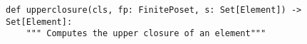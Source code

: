 \begin{verbatim}
def upperclosure(cls, fp: FinitePoset, s: Set[Element]) -> Set[Element]:
    """ Computes the upper closure of an element"""
\end{verbatim}